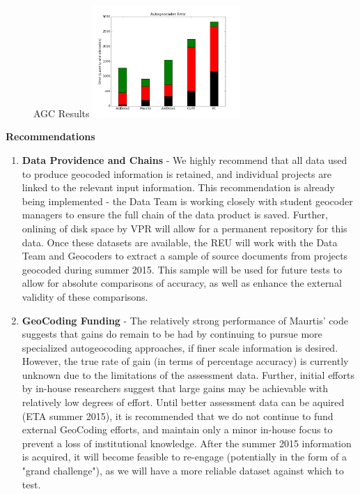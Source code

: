 \documentclass[10pt]{article}
\begin{document}
\begin{figure}{AGC Results}
\centering
\includegraphics[scale=1.0,width=0.5\textwidth]{compare_plot_20150402.png}
\end{figure}

\vspace{0.25cm}
\textbf{Recommendations}
\begin{enumerate}
\item \textbf{Data Providence and Chains} - We highly recommend that all data used to produce geocoded information is retained, and individual projects are linked to the relevant input information. This recommendation is already being implemented - the Data Team is working closely with student geocoder managers to ensure the full chain of the data product is saved. Further, onlining of disk space by VPR will allow for a permanent repository for this data. Once these datasets are available, the REU will work with the Data Team and Geocoders to extract a sample of source documents from projects geocoded during summer 2015. This sample will be used for future tests to allow for absolute comparisons of accuracy, as well as enhance the external validity of these comparisons.
\item \textbf{GeoCoding Funding} - The relatively strong performance of Maurtis' code suggests that gains do remain to be had by continuing to pursue more specialized autogeocoding approaches, if finer scale information is desired.  However, the true rate of gain (in terms of percentage accuracy) is currently unknown due to the limitations of the assessment data.  Further, initial efforts by in-house researchers suggest that large gains may be achievable with relatively low degrees of effort. Until better assessment data can be aquired (ETA summer 2015), it is recommended that we do not continue to fund external GeoCoding efforts, and maintain only a minor in-house focus to prevent a loss of institutional knowledge.  After the summer 2015 information is acquired, it will become feasible to re-engage (potentially in the form of a "grand challenge"), as we will have a more reliable dataset against which to test.
\end{enumerate}
\end{document}
